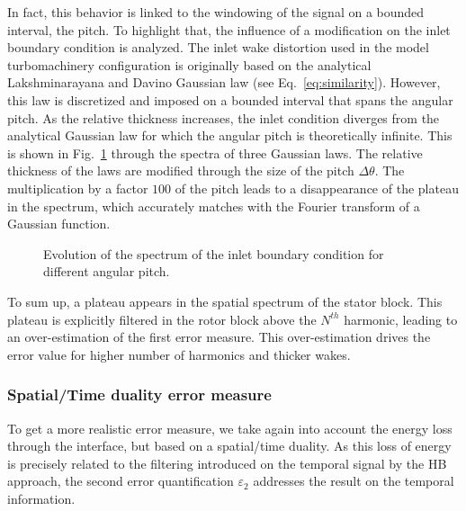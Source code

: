In fact, this behavior is linked to the windowing of the signal on 
a bounded interval, the pitch. To highlight that, the influence of 
a modification on the inlet boundary condition is analyzed.
The inlet wake distortion used in the model turbomachinery configuration is 
originally based on the analytical Lakshminarayana and Davino 
Gaussian law (see Eq.~\eqref{eq:similarity}). However, 
this law is discretized and imposed on a bounded interval 
that spans the angular pitch. As the relative thickness 
increases, the inlet condition diverges from the analytical 
Gaussian law for which the angular pitch is theoretically 
infinite. This is shown in Fig.~\ref{fig:inlet_law_fft} 
through the spectra of three Gaussian laws. The relative 
thickness of the laws are modified through the size 
of the pitch $\Delta \theta$. The multiplication by a factor $100$ 
of the pitch leads to a disappearance of the plateau 
in the spectrum, which accurately matches with the 
Fourier transform of a Gaussian function. 
\begin{figure}[htp]
  \centering
  \caption{Evolution of the spectrum of the inlet boundary condition for different angular pitch.}
  \label{fig:inlet_law_fft}
\end{figure}

To sum up, a plateau appears in the spatial spectrum of the
stator block. This plateau is explicitly filtered in the
rotor block above the $N^{th}$ harmonic, leading to an over-estimation of the 
first error measure. This over-estimation drives the error value
for higher number of harmonics and thicker wakes.

\FloatBarrier

\subsubsection{Spatial/Time duality error measure}
To get a more realistic error measure, we take 
again into account the energy loss
through the interface, but based on a spatial/time duality. 
As this loss of energy is 
precisely related to the filtering 
introduced on the temporal signal by the HB approach, the second 
error quantification $\varepsilon_2$ addresses the result on 
the temporal information. 

